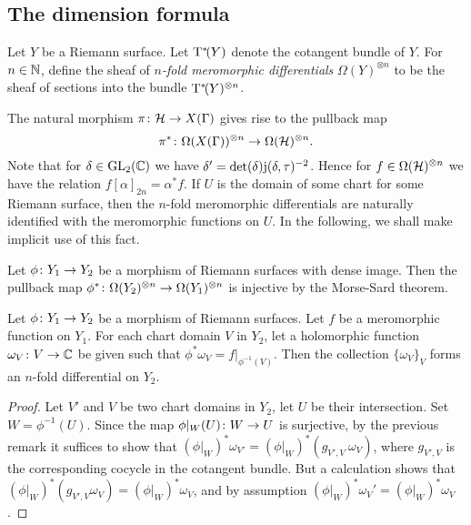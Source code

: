 \subsection{The dimension formula}

\begin{defi}
 Let $Y$ be a Riemann surface. Let $\mathrm{T}^*\!(Y)$ denote the cotangent bundle of $Y$. For $n\in\mathbb{N}$, define the sheaf of \emph{$n$-fold meromorphic differentials} $\Omega(Y)^{\otimes n}$ to be the sheaf of sections into the bundle $\mathrm{T}^*\!(Y)^{\otimes n}$.
\end{defi}

The natural morphism $\pi\colon\mathcal{H}\to X(\Gamma)$ gives rise to the pullback map \[\pi^*\colon\Omega(X(\Gamma))^{\otimes n}\to\Omega(\mathcal{H})^{\otimes n}.\]
Note that for $\delta\in\operatorname{GL}_2(\mathbb{C})$ we have $\delta'=\det(\delta)\mathrm{j}(\delta,\tau)^{-2}$. Hence for $f\in\Omega(\mathcal{H})^{\otimes n}$ we have the relation $f[\alpha]_{2n} = \alpha^* f$.
If $U$ is the domain of some chart for some Riemann surface, then the $n$-fold meromorphic differentials are naturally identified with the meromorphic functions on $U$. In the following, we shall make implicit use of this fact.

\begin{rmk} \label{pr:morse-sard}
 Let $\phi\colon Y_1\to Y_2$ be a morphism of Riemann surfaces with dense image. Then the pullback map $\phi^*\colon\Omega(Y_2)^{\otimes n}\to\Omega(Y_1)^{\otimes n}$ is injective by the Morse-Sard theorem.
\end{rmk}

\begin{prop} \label{pr:gluing-differentials}
 Let $\phi\colon Y_1\to Y_2$ be a morphism of Riemann surfaces. Let $f$ be a meromorphic function on $Y_1$. For each chart domain $V$ in $Y_2$, let a holomorphic function $\omega_V\colon V\to \mathbb{C}$ be given such that $\phi^*\omega_V=f|_{\phi^{-1}(V)}$. Then the collection $\{\omega_V\}_V$ forms an $n$-fold differential on $Y_2$.
\end{prop}

\begin{proof}
 Let $V'$ and $V$ be two chart domains in $Y_2$, let $U$ be their intersection. Set $W=\phi^{-1}(U)$. Since the map $\phi|_W(U)\colon W\to U$ is surjective, by the previous remark it suffices to show that $(\phi|_W)^*\omega_{V'}=(\phi|_W)^*(g_{V',V}\ \omega_V)$, where $g_{V',V}$ is the corresponding cocycle in the cotangent bundle. But a calculation shows that $(\phi|_W)^*(g_{V',V}\omega_V)=(\phi|_W)^* \omega_V$, and by assumption $(\phi|_W)^* \omega_V' = (\phi|_W)^* \omega_V$.
\end{proof}

